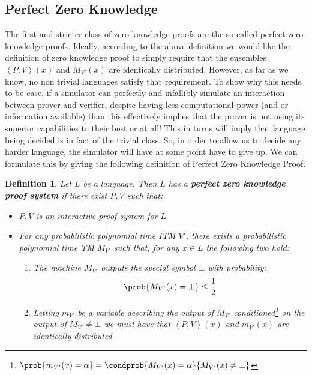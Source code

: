 \documentclass{article}
\newtheorem{definition}{Definition}
\begin{document}
\subsection{Perfect Zero Knowledge}
The first and stricter class of zero knowledge proofs are the so called perfect zero knowledge proofs.
Ideally, according to the above definition we would like the definition of zero knowledge proof to simply require
that the ensembles $\left<P, V\right>(x)$ and $M_{V'}(x)$ are identically distributed.
However, as far as we know, no non trivial languages satisfy that requirement.
To show why this needs to be case, if a simulator can perfectly and infallibly simulate an interaction between prover and verifier,
despite having less computational power (and or information available) than this effectively implies that the prover is not using its superior
capabilities to their best or at all! This in turns will imply that language being decided is in fact of the trivial class.
So, in order to allow us to decide any harder language, the simulator will have at some point have to give up.
We can formulate this by giving the following definition of Perfect Zero Knowledge Proof.
\begin{definition}
    Let $L$ be a language. Then $L$ has a \textbf{perfect zero knowledge proof system} if there exist $P, V$ such that:
    \begin{itemize}
        \item $P, V$ is an interactive proof system for $L$
        \item For any probabilistic polynomial time ITM $V'$, there exists a probabilistic polynomial time TM $M_{V'}$ such that, for any $x \in L$ the following two hold:
              \begin{enumerate}
                  \item The machine $M_{V'}$ outputs the special symbol $\bot$ with probability: \[\prob{M_{V'}(x) = \bot} \leq \frac{1}{2}\]
                  \item Letting $m_{V'}$ be a variable describing the output of $M_{V'}$ conditioned\footnote{$\prob{m_{V'}(x) = \alpha} = \condprob{M_{V'}(x) = \alpha}{M_{V'}(x) \neq \bot}$} on the output of $M_{V'} \neq \bot$  we must have that $\left<P, V\right>(x)$ and $m_{V'}(x)$ are identically distributed
              \end{enumerate}
    \end{itemize}
\end{definition}
\end{document}
